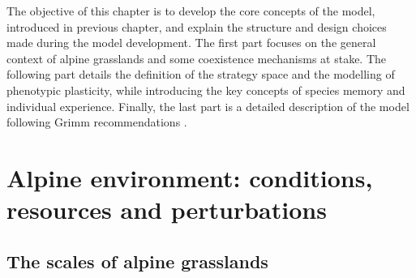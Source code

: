 %


\begin{fullwidth}
The objective of this chapter is to develop the core concepts of the model, introduced in previous chapter, and explain the structure and design choices made during the model development. The first part focuses on the general context of alpine grasslands and some coexistence mechanisms at stake. The following part details the definition of the strategy space and the modelling of phenotypic plasticity, while introducing the key concepts of species memory and individual experience. Finally, the last part is a detailed description of the model following Grimm recommendations \cite{grimm_standard_2006}.
\end{fullwidth}

\chapter{Alpine environment: conditions, resources and perturbations}
\section{The scales of alpine grasslands}

